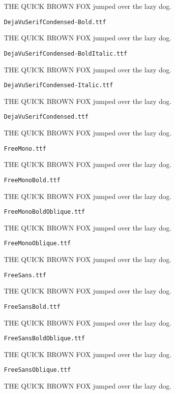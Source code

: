 \documentclass{article}
\begin{document}
THE QUICK BROWN FOX jumped over the lazy dog.

\setmainfont[Extension=.ttf]{DejaVuSerifCondensed-Bold}
\noindent \verb!DejaVuSerifCondensed-Bold.ttf!

THE QUICK BROWN FOX jumped over the lazy dog.

\setmainfont[Extension=.ttf]{DejaVuSerifCondensed-BoldItalic}
\noindent \verb!DejaVuSerifCondensed-BoldItalic.ttf!

THE QUICK BROWN FOX jumped over the lazy dog.

\setmainfont[Extension=.ttf]{DejaVuSerifCondensed-Italic}
\noindent \verb!DejaVuSerifCondensed-Italic.ttf!

THE QUICK BROWN FOX jumped over the lazy dog.

\setmainfont[Extension=.ttf]{DejaVuSerifCondensed}
\noindent \verb!DejaVuSerifCondensed.ttf!

THE QUICK BROWN FOX jumped over the lazy dog.

\setmainfont[Extension=.ttf]{FreeMono}
\noindent \verb!FreeMono.ttf!

THE QUICK BROWN FOX jumped over the lazy dog.

\setmainfont[Extension=.ttf]{FreeMonoBold}
\noindent \verb!FreeMonoBold.ttf!

THE QUICK BROWN FOX jumped over the lazy dog.

\setmainfont[Extension=.ttf]{FreeMonoBoldOblique}
\noindent \verb!FreeMonoBoldOblique.ttf!

THE QUICK BROWN FOX jumped over the lazy dog.

\setmainfont[Extension=.ttf]{FreeMonoOblique}
\noindent \verb!FreeMonoOblique.ttf!

THE QUICK BROWN FOX jumped over the lazy dog.

\setmainfont[Extension=.ttf]{FreeSans}
\noindent \verb!FreeSans.ttf!

THE QUICK BROWN FOX jumped over the lazy dog.

\setmainfont[Extension=.ttf]{FreeSansBold}
\noindent \verb!FreeSansBold.ttf!

THE QUICK BROWN FOX jumped over the lazy dog.

\setmainfont[Extension=.ttf]{FreeSansBoldOblique}
\noindent \verb!FreeSansBoldOblique.ttf!

THE QUICK BROWN FOX jumped over the lazy dog.

\setmainfont[Extension=.ttf]{FreeSansOblique}
\noindent \verb!FreeSansOblique.ttf!

THE QUICK BROWN FOX jumped over the lazy dog.
\end{document}
